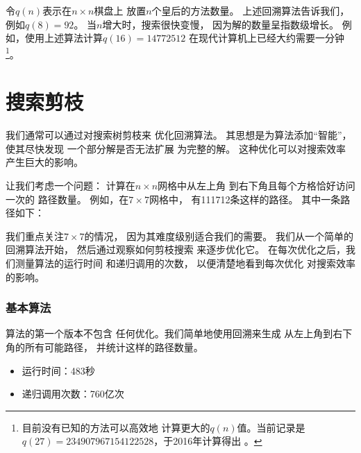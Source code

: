 令$q(n)$表示在$n \times n$棋盘上
放置$n$个皇后的方法数量。
上述回溯算法告诉我们，
例如$q(8)=92$。
当$n$增大时，搜索很快变慢，
因为解的数量呈指数级增长。
例如，使用上述算法计算$q(16)=14772512$
在现代计算机上已经大约需要一分钟\footnote{目前没有已知的方法可以高效地
计算更大的$q(n)$值。当前记录是
$q(27)=234907967154122528$，于2016年计算得出 \cite{q27}。}。

\section{搜索剪枝}

我们通常可以通过对搜索树剪枝来
优化回溯算法。
其思想是为算法添加“智能”，
使其尽快发现
一个部分解是否无法扩展
为完整的解。
这种优化可以对搜索效率
产生巨大的影响。

让我们考虑一个问题：
计算在$n \times n$网格中从左上角
到右下角且每个方格恰好访问一次的
路径数量。
例如，在$7 \times 7$网格中，
有111712条这样的路径。
其中一条路径如下：

\begin{center}
\end{center}

我们重点关注$7 \times 7$的情况，
因为其难度级别适合我们的需要。
我们从一个简单的回溯算法开始，
然后通过观察如何剪枝搜索
来逐步优化它。
在每次优化之后，我们测量算法的运行时间
和递归调用的次数，
以便清楚地看到每次优化
对搜索效率的影响。

\subsubsection{基本算法}

算法的第一个版本不包含
任何优化。我们简单地使用回溯来生成
从左上角到右下角的所有可能路径，
并统计这样的路径数量。

\begin{itemize}
\item
运行时间：483秒
\item
递归调用次数：760亿次
\end{itemize}

